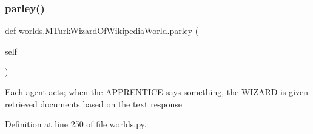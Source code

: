 \subsubsection{\texorpdfstring{parley()}{parley()}}
{\footnotesize\ttfamily def worlds.\+M\+Turk\+Wizard\+Of\+Wikipedia\+World.\+parley (\begin{DoxyParamCaption}\item[{}]{self }\end{DoxyParamCaption})}

\begin{DoxyVerb}Each agent acts; when the APPRENTICE says something, the
WIZARD is given retrieved documents based on the text response\end{DoxyVerb}
 

Definition at line 250 of file worlds.\+py.



